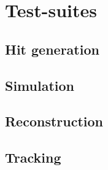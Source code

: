 \chapter{Test-suites}

\section{Hit generation}

\section{Simulation}

\section{Reconstruction}

\section{Tracking}




